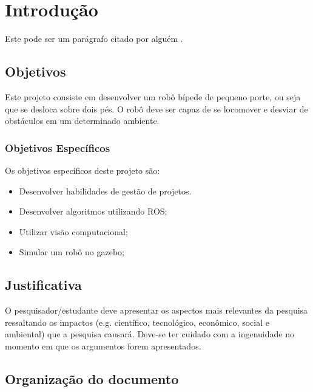 \chapter{Introdução}
\label{chap:intro}

Este pode ser um parágrafo citado por alguém \cite{Barabasi2003-1}.

\section{Objetivos}
\label{sec:obj}
Este projeto consiste em desenvolver um robô bípede de pequeno porte, ou seja que se desloca sobre dois pés. O robô deve ser capaz de se locomover e desviar de obstáculos em um determinado ambiente. 


\subsection{Objetivos Específicos}
\label{ssec:objesp}
Os objetivos específicos deste projeto são:
\begin{itemize}
      \item Desenvolver habilidades de gestão de projetos.
      \item Desenvolver algoritmos utilizando ROS;
      \item Utilizar visão computacional;
      \item Simular um robô no gazebo;
  \end{itemize}



\section{Justificativa}
\label{sec:justi}

O pesquisador/estudante deve apresentar os aspectos mais
relevantes da pesquisa ressaltando os impactos (e.g. cient\'ifico,
tecnol\'ogico, econ\^omico, social e ambiental) que a pesquisa
causar\'a. Deve-se ter cuidado com a ingenuidade no momento em que
os argumentos forem apresentados.




\section{Organização do documento}
\label{section:organizacao}

